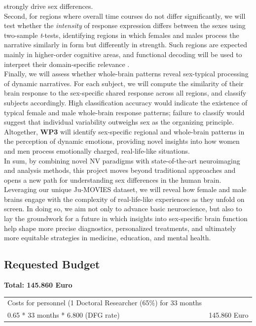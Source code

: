 \documentclass[11pt,a4paper]{article}
\begin{document}
strongly drive sex differences.\\
Second, for regions where overall time courses do not differ significantly, we will test whether the \textit{intensity} of 
response expression differs between the sexes using two-sample \textit{t}-tests, identifying regions in which 
females and males process the narrative similarly in form but differently in strength. 
Such regions are expected mainly in higher-order cognitive areas, and functional decoding will be
used to interpret their domain-specific relevance \parencite{foxMetaanalysisHumanNeuroimaging2014a}.\\  
Finally, we will assess whether whole-brain patterns reveal sex-typical processing of dynamic narratives. 
For each subject, we will compute the similarity of their brain response to the sex-specific shared response 
across all regions, and classify subjects accordingly. High classification accuracy would indicate 
the existence of typical female and male whole-brain response patterns; failure to classify would 
suggest that individual variability outweighs sex as the organizing principle.\\
Altogether, \textbf{WP3} will identify sex-specific regional and whole-brain patterns in the perception of 
dynamic emotions, providing novel insights into how women and men process emotionally charged, 
real-life-like situations.\\  
[6pt]
In sum, by combining novel NV paradigms with state-of-the-art neuroimaging and analysis methods, 
this project moves beyond traditional approaches and opens a new path for understanding sex differences 
in the human brain. Leveraging our unique Ju-MOVIES dataset, we will reveal how female and male brains engage 
with the complexity of real-life-like experiences as they unfold on screen.
In doing so, we aim not only to advance basic neuroscience, 
but also to lay the groundwork for a future in which insights into sex-specific brain 
function help shape more precise diagnostics, personalized treatments, and ultimately more equitable 
strategies in medicine, education, and mental health.

\newpage

\subsection*{Requested Budget}

\noindent\textbf{Total: 145.860 Euro}

\begin{longtable}{p{12cm} p{\dimexpr\textwidth-12cm-2\tabcolsep}}
\toprule
\endfirsthead
\endhead
Costs for personnel (1 Doctoral Researcher (65\%) for 33 months \\ 0.65 * 33 months * 6.800 (DFG rate) & 145.860 Euro \\
\bottomrule
\end{longtable}
\end{document}
